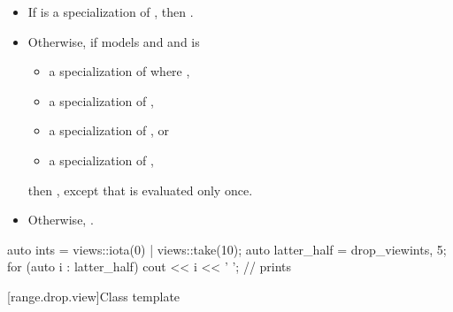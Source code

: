 \begin{itemize}
\item
If  is a specialization of
,
then .

\item
Otherwise, if  models
 and 
and is
\begin{itemize}
\item a specialization of  where ,
\item a specialization of ,
\item a specialization of , or
\item a specialization of ,
\end{itemize}
then ,
except that  is evaluated only once.

\item
Otherwise, .
\end{itemize}

\pnum
\begin{example}
\begin{codeblock}
auto ints = views::iota(0) | views::take(10);
auto latter_half = drop_view{ints, 5};
for (auto i : latter_half) {
  cout << i << ' ';                             // prints 
}
\end{codeblock}
\end{example}

[range.drop.view]{Class template }

